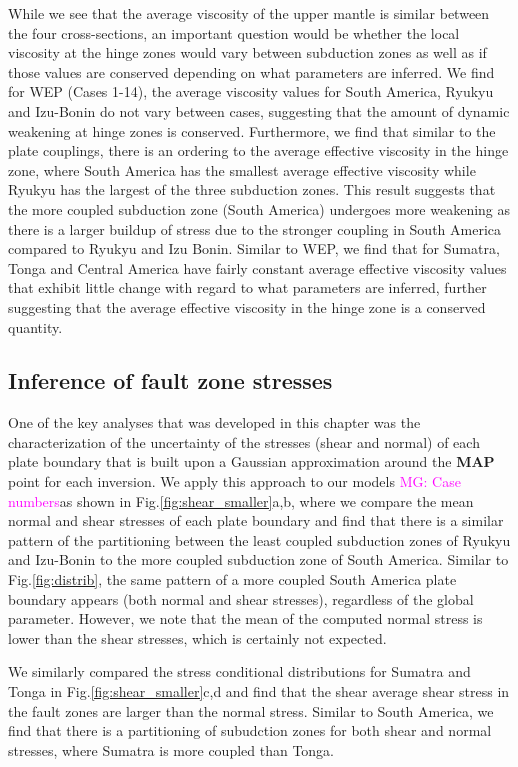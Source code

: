\documentclass[12pt]{article}
\newcommand{\mgnote}[1]{\textcolor{magenta}{MG: #1}}
\begin{document}
{While we see that the average viscosity of the upper mantle is similar between the four cross-sections, an important question would be whether the local viscosity at the hinge zones would vary between subduction zones as well as if those values are conserved depending on what parameters are inferred. We find for WEP (Cases 1-14), the average viscosity values for South America, Ryukyu and Izu-Bonin do not vary between cases, suggesting that the amount of dynamic weakening at hinge zones is conserved. Furthermore, we find that similar to the plate couplings, there is an ordering to the average effective viscosity in the hinge zone, where South America has the smallest average effective viscosity while Ryukyu has the largest of the three subduction zones. This result suggests that the more coupled subduction zone (South America) undergoes more weakening as there is a larger buildup of stress due to the stronger coupling in South America compared to Ryukyu and Izu Bonin.  Similar to WEP, we find that for Sumatra, Tonga and Central America have fairly constant average effective viscosity values that exhibit little change with regard to what parameters are inferred, further suggesting that the average effective viscosity in the hinge zone is a conserved quantity.



\subsection{Inference of fault zone stresses}


One of the key analyses that was developed in this chapter was the characterization of the uncertainty of the stresses (shear and normal) of each plate boundary that is built upon a Gaussian approximation around the \textbf{MAP} point for each inversion. We apply this approach to our models \mgnote{Case numbers}as shown in Fig.\ref{fig:shear_smaller}a,b, where we compare the mean normal and shear stresses of each plate boundary and find that there is a similar pattern of the partitioning between the least coupled subduction zones of Ryukyu and Izu-Bonin to the more coupled subduction zone of South America. Similar to Fig.\ref{fig:distrib}, the same pattern of a more coupled South America plate boundary appears (both normal and shear stresses), regardless of the global parameter. However, we note that the mean of the computed normal stress is lower than the shear stresses, which is certainly not expected.


We similarly compared the stress conditional distributions for Sumatra and Tonga in Fig.\ref{fig:shear_smaller}c,d and find that the shear average shear stress in the fault zones are larger than the normal stress. Similar to South America, we find that there is a partitioning of subudction zones for both shear and normal stresses, where Sumatra is more coupled than Tonga.


}
\end{document}
